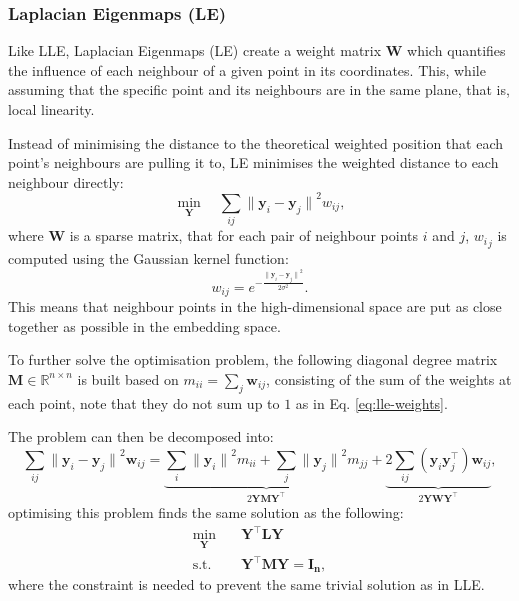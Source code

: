     \subsubsection{Laplacian Eigenmaps (LE)}
        Like LLE, Laplacian Eigenmaps (LE) \cite{le} create a weight matrix $\bm{W}$ which quantifies the influence of each neighbour of a given point in its coordinates. This, while assuming that the specific point and its neighbours are in the same plane, that is, local linearity.

        Instead of minimising the distance to the theoretical weighted position that each point's neighbours are pulling it to, LE minimises the weighted distance to each neighbour directly:
        \begin{equation}
            \min_{\bm{Y}} \quad \sum_{ij} {\| \bm{y}_i - \bm{y}_j \|}^2 w_{ij},
        \end{equation}
        where $\bm{W}$ is a sparse matrix, that for each pair of neighbour points $i$ and $j$, ${w_i}_j$ is computed using the Gaussian kernel function:
        \begin{equation}
            w_{ij} = e^{-\frac{{\| \bm{y}_i - \bm{y}_j \|}^2}{2\sigma^2}}.
        \end{equation}
        This means that neighbour points in the high-dimensional space are put as close together as possible in the embedding space.
        
        To further solve the optimisation problem, the following diagonal degree matrix $\bm{M}\in\mathbb{R}^{n\times n}$ is built based on $m_{ii}=\sum_j \bm{w}_{ij}$, consisting of the sum of the weights at each point, note that they do not sum up to $1$ as in Eq. \ref{eq:lle-weights}.
        
        The problem can then be decomposed into:
        \begin{equation}
            \sum_{ij} {\| \bm{y}_i - \bm{y}_j \|}^2 \bm{w}_{ij} =
                \underbrace{
                    \sum_{i} {\| \bm{y}_i\|}^2 m_{ii} +
                    \sum_{j} {\| \bm{y}_j \|}^2 m_{jj}
                }_{2\bm{YMY^\top}} +
                \underbrace{
                    2\sum_{ij} (\bm{y}_i \bm{y}_j^\top ) \bm{w}_{ij}
                }_{2\bm{YWY^\top}},
        \end{equation}
        optimising this problem finds the same solution as the following:
        \begin{align}
            \min_{\bm{Y}} \quad & \bm{Y^\top LY} \\
            \textrm{s.t.} \quad 
                & \bm{Y^\top MY} = \bm{I_n},
        \end{align}
        where the constraint is needed to prevent the same trivial solution as in LLE.
        
